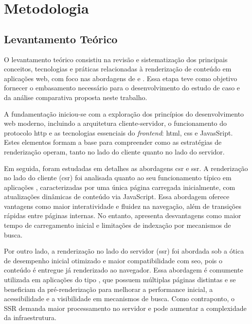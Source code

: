\chapter{Metodologia}
\label{cap:metodologia}

\section{Levantamento Teórico}
\label{sec:levantamento-teorico}

O levantamento teórico consistiu na revisão e sistematização dos principais conceitos, tecnologias e práticas relacionadas à renderização de conteúdo em aplicações web, com foco nas abordagens de  e . Essa etapa teve como objetivo fornecer o embasamento necessário para o desenvolvimento do estudo de caso e da análise comparativa proposta neste trabalho.

A fundamentação iniciou-se com a exploração dos princípios do desenvolvimento web moderno, incluindo a arquitetura cliente-servidor, o funcionamento do protocolo \acrshort{http} e as tecnologias essenciais do \textit{frontend}: \acrshort{html}, \acrshort{css} e JavasSript. Estes elementos formam a base para compreender como as estratégias de renderização operam, tanto no lado do cliente quanto no lado do servidor.

Em seguida, foram estudadas em detalhes as abordagens \acrshort{csr} e \acrshort{ssr}. A renderização no lado do cliente (\acrshort{csr}) foi analisada quanto ao seu funcionamento típico em aplicações , caracterizadas por uma única página carregada inicialmente, com atualizações dinâmicas de conteúdo via JavaScript. Essa abordagem oferece vantagens como maior interatividade e fluidez na navegação, além de transições rápidas entre páginas internas. No entanto, apresenta desvantagens como maior tempo de carregamento inicial e limitações de indexação por mecanismos de busca.

Por outro lado, a renderização no lado do servidor (\acrshort{ssr}) foi abordada sob a ótica de desempenho inicial otimizado e maior compatibilidade com \acrshort{seo}, pois o conteúdo é entregue já renderizado ao navegador. Essa abordagem é comumente utilizada em aplicações do tipo , que possuem múltiplas páginas distintas e se beneficiam da pré-renderização para melhorar a performance inicial, a acessibilidade e a visibilidade em mecanismos de busca. Como contraponto, o SSR demanda maior processamento no servidor e pode aumentar a complexidade da infraestrutura.

